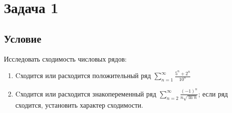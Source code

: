 \documentclass[12pt]{article}
\begin{document}
	\section*{Задача 1}	
	\subsection*{Условие}
	
	Исследовать сходимость числовых рядов:  

	\begin{enumerate}
		\item Cходится или расходится положительный ряд $ \sum_{n=1}^{\infty} \frac{5^n + 2^n}{10^n} $
		\item Cходится или расходится знакопеременный ряд  $ \sum_{n=2}^{\infty} \frac{(-1)^n}{n\sqrt{\ln{n}}} $; если ряд сходится, установить характер сходимости.
	\end{enumerate}
\end{document}
